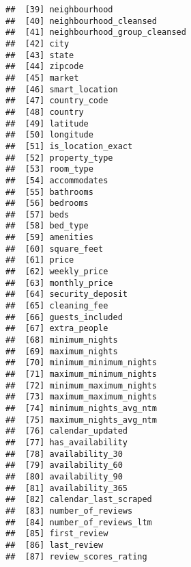 \documentclass[
]{article}
\begin{document}
\begin{verbatim}
##  [39] neighbourhood                               
##  [40] neighbourhood_cleansed                      
##  [41] neighbourhood_group_cleansed                
##  [42] city                                        
##  [43] state                                       
##  [44] zipcode                                     
##  [45] market                                      
##  [46] smart_location                              
##  [47] country_code                                
##  [48] country                                     
##  [49] latitude                                    
##  [50] longitude                                   
##  [51] is_location_exact                           
##  [52] property_type                               
##  [53] room_type                                   
##  [54] accommodates                                
##  [55] bathrooms                                   
##  [56] bedrooms                                    
##  [57] beds                                        
##  [58] bed_type                                    
##  [59] amenities                                   
##  [60] square_feet                                 
##  [61] price                                       
##  [62] weekly_price                                
##  [63] monthly_price                               
##  [64] security_deposit                            
##  [65] cleaning_fee                                
##  [66] guests_included                             
##  [67] extra_people                                
##  [68] minimum_nights                              
##  [69] maximum_nights                              
##  [70] minimum_minimum_nights                      
##  [71] maximum_minimum_nights                      
##  [72] minimum_maximum_nights                      
##  [73] maximum_maximum_nights                      
##  [74] minimum_nights_avg_ntm                      
##  [75] maximum_nights_avg_ntm                      
##  [76] calendar_updated                            
##  [77] has_availability                            
##  [78] availability_30                             
##  [79] availability_60                             
##  [80] availability_90                             
##  [81] availability_365                            
##  [82] calendar_last_scraped                       
##  [83] number_of_reviews                           
##  [84] number_of_reviews_ltm                       
##  [85] first_review                                
##  [86] last_review                                 
##  [87] review_scores_rating                        

\end{verbatim}
\end{document}
